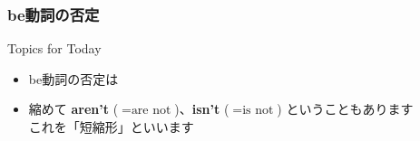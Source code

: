 \documentclass[aspectratio=169,xcolor={dvipsnames,table}]{beamer}
\begin{document}
\begin{frame}[plain]\frametitle{be動詞の否定}
%
       \begin{exampleblock}{Topics for Today}
\begin{itemize}
 \item  be動詞の否定は\,\,
 \item  縮めて {\bfseries aren't} ($=\text{are not}$)、{\bfseries isn't} ($=\text{is not}$) ということもあります\\
\mbox{}\hfill{}{\scriptsize これを「短縮形」といいます}\,\,
\end{itemize}
      \end{exampleblock}

\end{frame}
\end{document}
